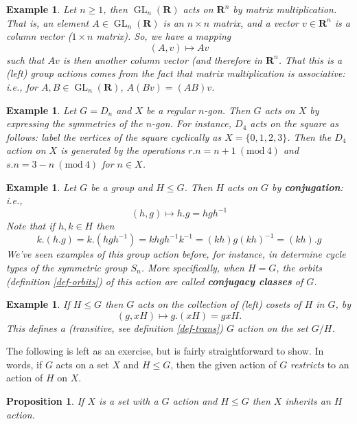 \documentclass[12pt]{article}
\numberwithin{equation}{subsection}
\newtheorem{prop}[subsection]{Proposition}
\theoremstyle{note}
\newtheorem{example}[subsection]{Example}
\newcommand{\Mod}[1]{\ (\mathrm{mod}\ #1)}
\newcommand{\GL}{\operatorname{GL}}
\begin{document}
\begin{example} \label{GL-action}
	Let $n\geq 1$, then $\GL_n(\mathbf{R})$ acts on $\mathbf{R}^n$ by matrix multiplication. That is, an element $A\in \GL_n(\mathbf{R})$ is an $n\times n$ matrix, and a vector $v\in \mathbf{R}^n$ is a column vector ($1\times n$ matrix). So, we have a mapping \[ (A,v)\mapsto Av\] such that $Av$ is then another column vector (and therefore in $\mathbf{R}^n$. That this is a (left) group actions comes from the fact that matrix multiplication  is associative: i.e., for $A,B\in \GL_n(\mathbf{R})$, $A(Bv)=(AB)v$.
\end{example}

\begin{example}
	Let $G=D_n$ and $X$ be a regular $n$-gon. Then $G$ acts on $X$ by expressing the symmetries of the $n$-gon. For instance, $D_4$ acts on the square as follows: label the vertices of the square cyclically as $X=\{0,1,2,3\}$. Then the $D_4$ action on $X$ is generated by the operations $r.n=n+1\Mod{4}$ and $s.n=3-n\Mod{4}$ for $n\in X$.
\end{example}

\begin{example}
	Let $G$ be a group and $H\leq G$. Then $H$ acts on $G$ by \textbf{conjugation}: i.e., \begin{equation} (h,g)\mapsto h.g=hgh^{-1}\end{equation} Note that if $h,k\in H$ then \[ k.(h.g)=k.(hgh^{-1})=khgh^{-1}k^{-1}=(kh)g(kh)^{-1}=(kh).g\]
	We've seen examples of this group action before, for instance, in determine cycle types of the symmetric group $S_n$. More specifically, when $H=G$, the orbits (definition \ref{def-orbits}) of this action are called \textbf{conjugacy classes} of $G$. 
\end{example}

\begin{example}
	If $H\leq G$ then $G$ acts on the collection of (left) cosets of $H$ in $G$, by \[(g, xH)\mapsto g.(xH)=gxH.\] This defines a  (transitive, see definition \ref{def-trans}) $G$ action on the set $G/H$. 
\end{example}

The following is left as an exercise, but is fairly straightforward to show. In words, if $G$ acts on a set $X$ and $H\leq G$, then the given action of $G$ \textit{restricts} to an action of $H$ on $X$. 

\begin{prop} \label{restricted-action}
	If $X$ is a set with a $G$ action and $H\leq G$ then $X$ inherits an $H$ action. 
\end{prop}
\end{document}
